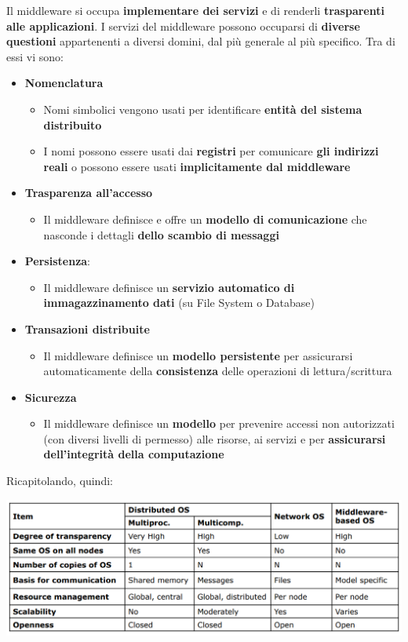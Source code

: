 \documentclass[12pt]{article}
\begin{document}
Il middleware si occupa \textbf{implementare dei servizi} e di renderli \textbf{trasparenti alle applicazioni}. I servizi del middleware possono occuparsi di \textbf{diverse questioni} appartenenti a diversi domini, dal più generale al più specifico. Tra di essi vi sono:
\begin{itemize}
    \item \textbf{Nomenclatura}
          \begin{itemize}
              \item Nomi simbolici vengono usati per identificare \textbf{entità del sistema distribuito}
              \item I nomi possono essere usati dai \textbf{registri} per comunicare \textbf{gli indirizzi reali} o possono essere usati \textbf{implicitamente dal middleware}
          \end{itemize}
    \item \textbf{Trasparenza all'accesso}
          \begin{itemize}
              \item Il middleware definisce e offre un \textbf{modello di comunicazione} che nasconde i dettagli \textbf{dello scambio di messaggi}
          \end{itemize}
    \item \textbf{Persistenza}:
          \begin{itemize}
              \item Il middleware definisce un \textbf{servizio automatico di immagazzinamento dati} (su File System o Database)
          \end{itemize}
    \item \textbf{Transazioni distribuite}
          \begin{itemize}
              \item Il middleware definisce un \textbf{modello persistente} per assicurarsi automaticamente della \textbf{consistenza} delle operazioni di lettura/scrittura
          \end{itemize}
    \item \textbf{Sicurezza}
          \begin{itemize}
              \item Il middleware definisce un \textbf{modello} per prevenire accessi non autorizzati (con diversi livelli di permesso) alle risorse, ai servizi e per \textbf{assicurarsi dell'integrità della computazione}
          \end{itemize}
\end{itemize}
Ricapitolando, quindi:
\begin{center}
    \includegraphics[width = 1\textwidth]{Images/15.PNG}
\end{center}
\end{document}
